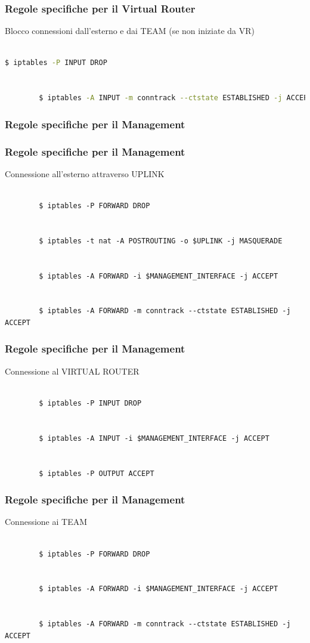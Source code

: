 \documentclass{beamer}
\begin{document}
\begin{frame}[fragile]
    \frametitle{Regole specifiche per il Virtual Router}
    Blocco connessioni dall'esterno e dai TEAM (se non iniziate da VR)
    \\~\\
    \begin{lstlisting}[language=sh]
        $ iptables -P INPUT DROP


        $ iptables -A INPUT -m conntrack --ctstate ESTABLISHED -j ACCEPT
    \end{lstlisting}
\end{frame}


\subsubsection{Regole specifiche per il Management}
\begin{frame}[fragile]
    \frametitle{Regole specifiche per il Management}
    Connessione all'esterno attraverso UPLINK
    \\~\\
    \begin{lstlisting}
        $ iptables -P FORWARD DROP

        
        $ iptables -t nat -A POSTROUTING -o $UPLINK -j MASQUERADE
        
        
        $ iptables -A FORWARD -i $MANAGEMENT_INTERFACE -j ACCEPT
        
        
        $ iptables -A FORWARD -m conntrack --ctstate ESTABLISHED -j ACCEPT
    \end{lstlisting}
\end{frame}

\begin{frame}[fragile]
    \frametitle{Regole specifiche per il Management}
    Connessione al VIRTUAL ROUTER
    \\~\\
    \begin{lstlisting}
        $ iptables -P INPUT DROP
        
        
        $ iptables -A INPUT -i $MANAGEMENT_INTERFACE -j ACCEPT
        
        
        $ iptables -P OUTPUT ACCEPT

    \end{lstlisting}
\end{frame}

\begin{frame}[fragile]
    \frametitle{Regole specifiche per il Management}
    Connessione ai TEAM
    \\~\\
    \begin{lstlisting}
        $ iptables -P FORWARD DROP
        
        
        $ iptables -A FORWARD -i $MANAGEMENT_INTERFACE -j ACCEPT
        
        
        $ iptables -A FORWARD -m conntrack --ctstate ESTABLISHED -j ACCEPT
    \end{lstlisting}
\end{frame}
\end{document}
